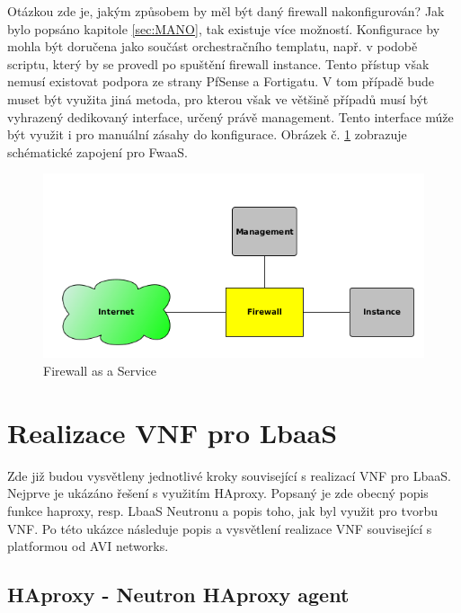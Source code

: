 Otázkou zde je, jakým způsobem by měl být daný firewall nakonfigurován? Jak bylo popsáno kapitole \ref{sec:MANO}, tak existuje více možností. Konfigurace by mohla být doručena jako součást orchestračního templatu, např. v podobě scriptu, který by se provedl po spuštění firewall instance. Tento přístup však nemusí existovat podpora ze strany PfSense a Fortigatu. V tom případě bude muset být využita jiná metoda, pro kterou však ve většině případů musí být vyhrazený dedikovaný interface, určený právě management. Tento interface múže být využit i pro manuální zásahy do konfigurace. Obrázek č. \ref{fig:firewall} zobrazuje schématické zapojení pro FwaaS.

\begin{figure}[h]
\begin{centering}
\includegraphics[scale=0.6]{images/firewall}
\par\end{centering}
\caption{Firewall as a Service\label{fig:firewall}}
\end{figure}


\section{Realizace VNF pro LbaaS} \label{sec:realizace_lbaas}

Zde již budou vysvětleny jednotlivé kroky související s realizací VNF pro LbaaS. Nejprve je ukázáno řešení s využitím HAproxy. Popsaný je zde obecný popis funkce haproxy, resp. LbaaS Neutronu a popis toho, jak byl využit pro tvorbu VNF. Po této ukázce následuje popis a vysvětlení realizace VNF související s platformou od AVI networks.

\subsection{HAproxy - Neutron HAproxy agent}

